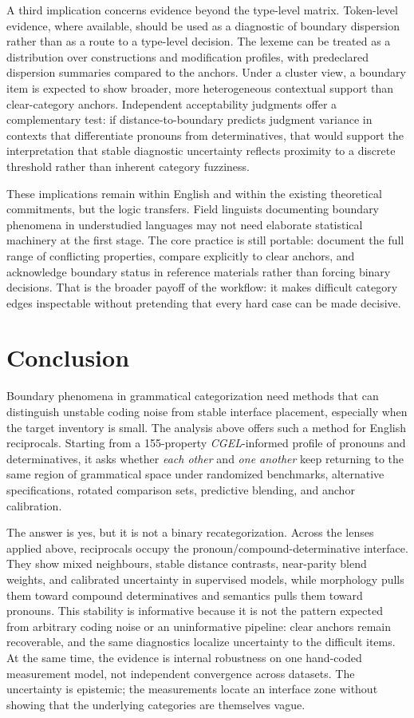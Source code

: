 \documentclass[12pt]{article}
\providecommand{\mention}[1]{\textit{#1}}
\begin{document}
A third implication concerns evidence beyond the type-level matrix. Token-level evidence, where available, should be used as a diagnostic of boundary dispersion rather than as a route to a type-level decision. The lexeme can be treated as a distribution over constructions and modification profiles, with predeclared dispersion summaries compared to the anchors. Under a cluster view, a boundary item is expected to show broader, more heterogeneous contextual support than clear-category anchors. Independent acceptability judgments offer a complementary test: if distance-to-boundary predicts judgment variance in contexts that differentiate pronouns from determinatives, that would support the interpretation that stable diagnostic uncertainty reflects proximity to a discrete threshold rather than inherent category fuzziness.

These implications remain within English and within the existing theoretical commitments, but the logic transfers. Field linguists documenting boundary phenomena in understudied languages may not need elaborate statistical machinery at the first stage. The core practice is still portable: document the full range of conflicting properties, compare explicitly to clear anchors, and acknowledge boundary status in reference materials rather than forcing binary decisions. That is the broader payoff of the workflow: it makes difficult category edges inspectable without pretending that every hard case can be made decisive.


\section{Conclusion}

Boundary phenomena in grammatical categorization need methods that can distinguish unstable coding noise from stable interface placement, especially when the target inventory is small. The analysis above offers such a method for English reciprocals. Starting from a 155-property \textit{CGEL}-informed profile of pronouns and determinatives, it asks whether \mention{each other} and \mention{one another} keep returning to the same region of grammatical space under randomized benchmarks, alternative specifications, rotated comparison sets, predictive blending, and anchor calibration.

The answer is yes, but it is not a binary recategorization. Across the lenses applied above, reciprocals occupy the pronoun/compound-determinative interface. They show mixed neighbours, stable distance contrasts, near-parity blend weights, and calibrated uncertainty in supervised models, while morphology pulls them toward compound determinatives and semantics pulls them toward pronouns. This stability is informative because it is not the pattern expected from arbitrary coding noise or an uninformative pipeline: clear anchors remain recoverable, and the same diagnostics localize uncertainty to the difficult items. At the same time, the evidence is internal robustness on one hand-coded measurement model, not independent convergence across datasets. The uncertainty is epistemic; the measurements locate an interface zone without showing that the underlying categories are themselves vague.
\end{document}
